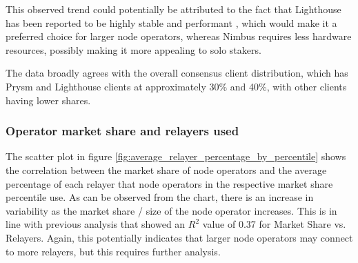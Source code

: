 \documentclass[conference]{IEEEtran}
\begin{document}
This observed trend could potentially be attributed to the fact that Lighthouse has been reported to be highly stable and performant \cite{ranjan2023}, which would make it a preferred choice for larger node operators, whereas Nimbus requires less hardware resources, possibly making it more appealing to solo stakers.

The data broadly agrees with the overall consensus client distribution, which has Prysm and Lighthouse clients at approximately 30\% and 40\%, with other clients having lower shares.


\subsubsection{Operator market share and relayers used}

The scatter plot in figure \ref{fig:average_relayer_percentage_by_percentile} shows the correlation between the market share of node operators and the average percentage of each relayer that node operators in the respective market share percentile use.  As can be observed from the chart, there is an increase in variability as the market share / size of the node operator increases.  This is in line with previous analysis that showed an $R^2$ value of 0.37 for Market Share vs. Relayers. Again, this potentially indicates that larger node operators may connect to more relayers, but this requires further analysis.
\end{document}
